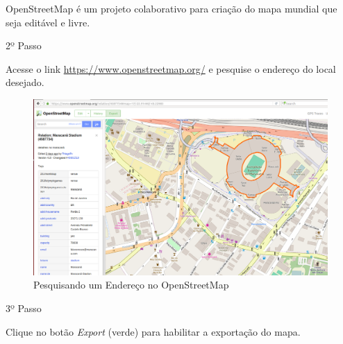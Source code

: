 \documentclass[
12pt,				%
openright,			%
oneside,			%
a4paper,			%
brazil,				%
]{abntex2}
\begin{document}
{\begin{anexosenv}
        	    \par OpenStreetMap é um projeto colaborativo para criação do mapa mundial que seja editável e livre.

            	\begin{description}
                    \item[2º Passo]
                \end{description}
                \par Acesse o link \href{https://www.openstreetmap.org/}{https://www.openstreetmap.org/} e pesquise o endereço do local desejado.
		            
                \begin{figure} [H]
	                \centering
	                \includegraphics[scale=.3]{figuras/aneC/70PesquisandoEndereco}
	                \caption{\label{fig_70}Pesquisando um Endereço no OpenStreetMap}
                \end{figure}
                    

            	\begin{description}
                    \item[3º Passo]
                \end{description}
                \par Clique no botão \textit{Export} (verde) para habilitar a exportação do mapa.
		            

\end{anexosenv}}
\end{document}
